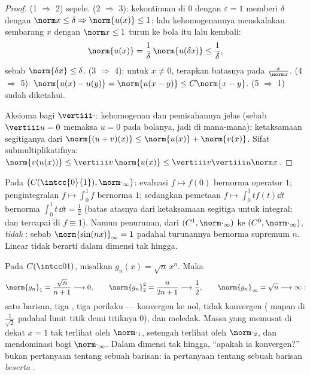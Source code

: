 \begin{proof}
(1 $\Rightarrow$ 2) sepele. (2 $\Rightarrow$ 3): kekontinuan di $0$
dengan $\varepsilon = 1$ memberi $\delta$ dengan $\norm x \leq \delta
\Rightarrow \norm{u(x)} \leq 1$; lalu kehomogenannya menskalakan
sembarang $x$ dengan $\norm x \leq 1$ turun ke bola itu lalu kembali:
\[
\norm{u(x)} = \frac1\delta\,\norm{u(\delta x)} \leq
\frac1\delta ,
\]
sebab $\norm{\delta x} \leq \delta$. (3 $\Rightarrow$ 4):
untuk $x \neq 0$, terapkan batasnya pada $\frac{x}{\norm x}$. (4
$\Rightarrow$ 5): $\norm{u(x) - u(y)} = \norm{u(x - y)} \leq
C\norm{x - y}$. (5 $\Rightarrow$ 1) sudah diketahui.

Aksioma  bagi $\vertiii\cdot$: kehomogenan dan pemisahannya
jelas (sebab $\vertiii u = 0$ memaksa $u = 0$ pada bolanya, jadi di
mana-mana); ketaksamaan segitiganya dari $\norm{(u + v)(x)} \leq
\norm{u(x)} + \norm{v(x)}$. Sifat submultiplikatifnya: $\norm{v(u(x))}
\leq \vertiii v\,\norm{u(x)} \leq \vertiii v \vertiii u \norm x$.
\end{proof}

\begin{example}\label{ex:b2:nvs:operatornorms}
Pada $\bigl(C(\intcc{0}{1}), \norm\cdot_\infty\bigr)$: evaluasi
$f \mapsto f(0)$ bernorma operator $1$; pengintegralan $f \mapsto
\int_0^1 f$ bernorma $1$; sedangkan pemetaan $f \mapsto \int_0^1 t f(t)\dd t$
bernorma $\int_0^1 t\,\dd t = \frac12$ (batas atasnya dari ketaksamaan
segitiga untuk integral; dan tercapai di $f \equiv 1$). Namun
penurunan, dari $(C^1, \norm\cdot_\infty)$ ke $(C^0,
\norm\cdot_\infty)$, \emph{tidak} : sebab $\norm{\sin(nx)}_\infty
= 1$ padahal turunannya bernorma supremum $n$. Linear tidak berarti
 dalam dimensi tak hingga.
\end{example}

\begin{example}\label{ex:b2:nvs:sqrtnxn}
Pada $C(\intcc01)$, misalkan $g_n(x) = \sqrt{n}\,x^n$. Maka
\[
\norm{g_n}_1 = \frac{\sqrt n}{n + 1} \longrightarrow 0,
\qquad
\norm{g_n}_2^2 = \frac{n}{2n + 1} \longrightarrow \frac12,
\qquad
\norm{g_n}_\infty = \sqrt n \longrightarrow \infty :
\]
satu barisan, tiga , tiga perilaku --- konvergen ke
nol, tidak konvergen ( mapan di $\frac1{\sqrt2}$ padahal
limit titik demi titiknya $0$), dan meledak. Massa yang memusat
di dekat $x = 1$ tak terlihat oleh $\norm\cdot_1$, setengah terlihat oleh
$\norm\cdot_2$, dan mendominasi bagi $\norm\cdot_\infty$. Dalam dimensi
tak hingga, ``apakah ia konvergen?'' bukan pertanyaan tentang sebuah
barisan: ia pertanyaan tentang sebuah barisan \emph{beserta} .
\end{example}

